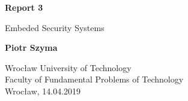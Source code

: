 \begin{titlepage}
  \begin{center}
      \vspace*{1cm}

      \textbf{Report 3}

      \vspace{0.5cm}
       Embeded Security Systems

      \vspace{1.5cm}

      \textbf{Piotr Szyma}

      \vfill

      \vspace{0.8cm}

      Wrocław University of Technology\\
      Faculty of Fundamental Problems of Technology\\
      Wrocław, 14.04.2019

  \end{center}
\end{titlepage}